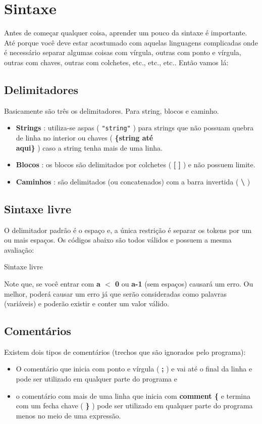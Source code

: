 \documentclass[12pt,a4paper]{article}
\newcommand{\inchf}[2]{
  \begin{listing}[ht]
    \begin{shaded}
      \small{
        
      }
    \end{shaded}
    \caption{#2}
    \label{listing:3}
  \end{listing}
}
\begin{document}
\section{Sintaxe}

Antes de começar qualquer coisa, aprender um pouco da sintaxe é importante. Até
porque você deve estar acostumado com aquelas linguagens complicadas onde é
necessário separar algumas coisas com vírgula, outras com ponto e vírgula,
outras com chaves, outras com colchetes, etc., etc., etc..
Então vamos lá:

\subsection{Delimitadores}

Basicamente são três os delimitadores. Para string, blocos e caminho.
\begin{itemize}
\item \textbf{Strings} : utiliza-se aspas ( \texttt{"string"} ) para strings que não
  possuam quebra de linha no interior ou chaves (\textbf{ \{string até\\ aqui\}} ) caso a string
  tenha mais de uma linha. 
\item \textbf{Blocos} : os blocos são delimitados por colchetes ( \textbf{[ ]} )
  e não possuem limite.
\item \textbf{Caminhos} : são delimitados (ou concatenados) com a barra
  invertida ( \textbf{\textbackslash} )
\end{itemize}

\subsection{Sintaxe livre}
O delimitador padrão é o espaço e, a única restrição é separar os tokens por um
ou mais espaços. Os códigos abaixo são todos válidos e possuem a mesma
avaliação:

\inchf{freeformsyntax}{Sintaxe livre}

Note que, se você entrar com  \textbf{a $<$ 0} ou \textbf{a-1} (sem espaços) causará
um erro. Ou melhor, poderá causar um erro já que serão consideradas como
palavras (variáveis) e poderão existir e conter um valor válido. 

\subsection{Comentários}
Existem dois tipos de comentários (trechos que são ignorados pelo programa): 
\begin{itemize}
\item O comentário que inicia com ponto e vírgula ( \textbf{;} ) e vai até o
  final da linha e pode ser utilizado em qualquer parte do programa e
\item o comentário com mais de uma linha que inicia com \textbf{comment \{} e
  termina com um fecha chave ( \textbf{\}} ) pode ser utilizado em qualquer
  parte do programa menos no meio de uma expressão.
\end{itemize}
\end{document}
